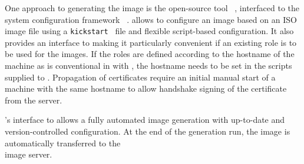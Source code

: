 
One approach to generating the image is the open-source tool
\Packer~\cite{packer}, interfaced to the system configuration framework \Puppet~\cite{puppet}.
\Packer allows to configure an image based on an ISO image file using a \texttt{kickstart}~\cite{kickstart} file and flexible script-based configuration. 
It also provides an interface to \Puppet making it particularly convenient if an existing \Puppet role is to be used for the images. If the roles are defined according to the hostname of the machine as is conventional in \Puppet with \Hieradata, the hostname needs to be set in the scripts supplied to \Packer. Propagation of certificates require an initial manual start of a machine with the same hostname to allow handshake signing of the certificate from the \Puppet server.

\Packer's interface to \Puppet allows a fully automated image generation with up-to-date and version-controlled configuration. At the end of the generation run, the image is automatically transferred to the \\\Openstack image server.




